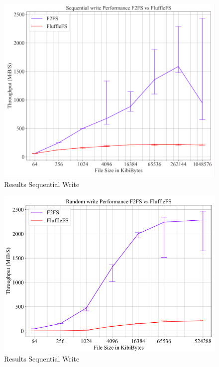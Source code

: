 \begin{figure}
    \centering
	\includegraphics[width=1\textwidth]{resources/images/results-sequential-write.pdf}
	\caption{Results Sequential Write}
    \label{figure:moduledependencies}
\end{figure}

\begin{figure}
    \centering
	\includegraphics[width=1\textwidth]{resources/images/results-random-write.pdf}
	\caption{Results Sequential Write}
    \label{figure:moduledependencies}
\end{figure}

